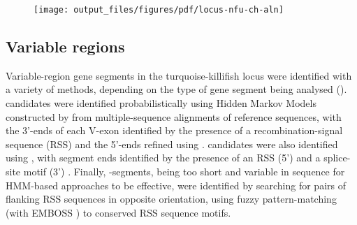 	\begin{figure}
	\centering
	\texttt{[image: output\_files/figures/pdf/locus-nfu-ch-aln]}
	\label{fig:nfu-ch-aln}
	\end{figure}
	
	\begin{table}\centering
	
	\label{tab:nfu-ch-aln}
	\end{table}
	
\subsection{Variable regions}
\label{sec:nfu-locus-variable}
	
Variable-region gene segments in the turquoise-killifish \igh{} locus were identified with a variety of methods, depending on the type of gene segment being analysed (). \vh candidates were identified probabilistically using Hidden Markov Models constructed by  \parencite{wheeler2013nhmmer} from  \parencite{loytynoja2014prank} multiple-sequence alignments of reference sequences, with the 3'-ends of each V-exon identified by the presence of a recombination-signal sequence (RSS) \parencite{schroeder2010immunoglobulins} and the 5'-ends refined using  \parencite{ehrenmann2011domaingapalign}. \jh candidates were also identified using , with segment ends identified by the presence of an RSS (5') and a  splice-site motif (3') \parencite{magadan2011medaka}. Finally, \dh-segments, being too short and variable in sequence for HMM-based approaches to be effective, were identified by searching for pairs of flanking RSS sequences in opposite orientation, using fuzzy pattern-matching (with EMBOSS  \parencite{rice2000emboss}) to conserved RSS sequence motifs.
	 
